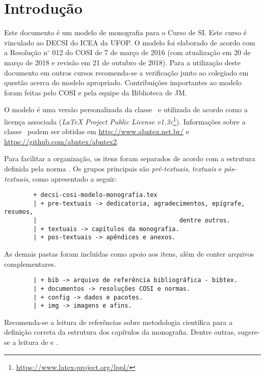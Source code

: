 \chapter{Introdução}
\label{cap:introducao}

Este documento é um modelo de monografia para o Curso de \acf{SI}. Este curso é vinculado ao \acf{DECSI} do \acf{ICEA} da \acf{UFOP}. O modelo foi elaborado de acordo com a Resolução n$^\circ$ 012 do \acf{COSI} de 7 de março de 2016 (com atualização em 20 de março de 2018 e revisão em 21 de outubro de 2018). Para a utilização deste documento em outros cursos recomenda-se a verificação junto ao colegiado em questão acerca do modelo apropriado. Contribuições importantes ao modelo foram feitas pelo COSI e pela equipe da Biblioteca de \acf{JM}.

O modelo é uma versão personalizada da classe \abnTeX\ e utilizada de acordo como a licença associada (\textit{LaTeX Project Public License v1.3c}\footnote{\url{https://www.latex-project.org/lppl/}}). Informações sobre a classe \abnTeX\ podem ser obtidas em \url{http://www.abntex.net.br/} e \url{https://github.com/abntex/abntex2}.

Para facilitar a organização, os itens foram separados de acordo com a estrutura definida pela norma . Os grupos principais são \textit{pré-textuais}, \textit{textuais} e \textit{pós-textuais}, como apresentado a seguir:

\begin{verbatim}
		+ decsi-cosi-modelo-monografia.tex
		| + pre-textuais -> dedicatoria, agradecimentos, epígrafe, resumos,
		|										dentre outros.
		| + textuais -> capítulos da monografia.
		| + pos-textuais -> apêndices e anexos.
\end{verbatim}

As demais pastas foram incluídas como apoio aos itens, além de conter arquivos complementares.

\begin{verbatim}
		| + bib -> arquivo de referência bibliográfica - bibtex.
		| + documentos -> resoluções COSI e normas.
		| + config -> dados e pacotes.
		| + img -> imagens e afins.
\end{verbatim}

Recomenda-se a leitura de referências sobre metodologia científica para a definição correta da estrutura dos capítulos da monografia. Dentre outras, sugere-se a leitura de  e .

